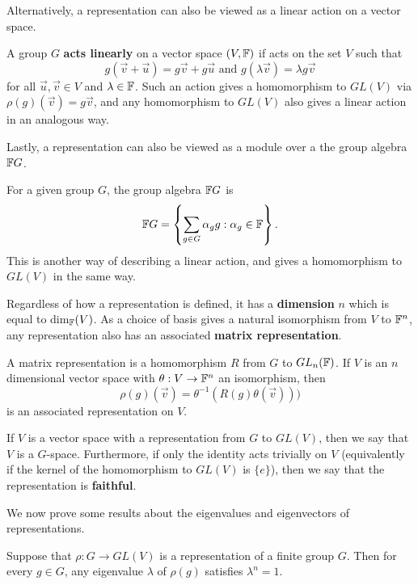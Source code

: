 \documentclass[a4paper]{article}
\begin{document}
Alternatively, a representation can also be viewed as a linear action on a vector space.
\begin{defi}
    A group $G$ \textbf{acts linearly} on a vector space $(V, \mathbb{F})$ if acts on the set $V$ such that $$g(\vec{v}+ \vec{u}) = g\vec{v} + g\vec{u} \text{ and } g(\lambda \vec{v}) = \lambda g\vec{v}$$
    for all $\vec{u}, \vec{v} \in V$ and $\lambda \in \mathbb{F}$. Such an action gives a homomorphism to $GL(V)$ via $\rho(g)(\vec{v}) = g\vec{v}$, and any homomorphism to $GL(V)$ also gives a linear action in an analogous way.
\end{defi}

Lastly, a representation can also be viewed as a module over a the group algebra $\mathbb{F} G$.
\begin{defi}
    For a given group $G$, the group algebra $\mathbb{F} G$ is 
    $$\mathbb{F} G = \left\{ \sum_{g \in G} \alpha_g g: \alpha_g \in \mathbb{F} \right\}.$$ This is another way of describing a linear action, and gives a homomorphism to $GL(V)$ in the same way.
\end{defi}

Regardless of how a representation is defined, it has a \textbf{dimension} $n$ which is equal to dim$_{\mathbb{F}}(V)$. As a choice of basis gives a natural isomorphism from $V$ to $\mathbb{F}^n$, any representation also has an associated \textbf{matrix representation}. 
\begin{defi}
    A matrix representation is a homomorphism $R$ from $G$ to $GL_n(\mathbb{F})$. If $V$ is an $n$ dimensional vector space with $\theta: V \to \mathbb{F}^n$ an isomorphism, then $$\rho(g)(\vec{v}) =  \theta^{-1}(R(g)\theta(\vec{v})))$$ is an associated representation on $V$. 
\end{defi}

If $V$ is a vector space with a representation from $G$ to $GL(V)$, then we say that $V$ is a $G$-space. Furthermore, if only the identity acts trivially on $V$ (equivalently if the kernel of the homomorphism to $GL(V)$ is $\{e\}$), then we say that the representation is \textbf{faithful}.

We now prove some results about the eigenvalues and eigenvectors of representations.

\begin{lemma}
    Suppose that $\rho : G \to GL(V)$ is a representation of a finite group $G$. Then for every $g \in G$, any eigenvalue $\lambda$ of $\rho(g)$ satisfies $\lambda^n = 1$.
\end{lemma} 
\end{document}
